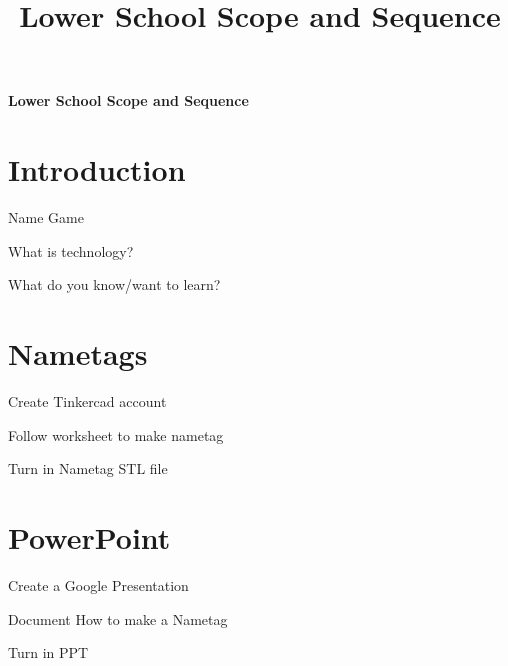 \documentclass{article}
\def\nametags{Nametags}
\def\ppt{PowerPoint}
\begin{document}
	\title{Lower School Scope and Sequence}
	\begin{titlepage}
		\begin{center}
			\Large\textbf{Lower School Scope and Sequence}\\
		\end{center}
	\end{titlepage}
	

	\vspace{1cm}
	\section{Introduction}
	\begin{todolist}
		\item Name Game
		\item What is technology?
		\item What do you know/want to learn?
	\end{todolist}
	\section{\nametags}
	\begin{todolist}
		\item Create Tinkercad account
		\item Follow worksheet to make nametag
		\item Turn in Nametag STL file
	\end{todolist}
	\section{\ppt}
	\begin{todolist}
		\item Create a Google Presentation
		\item Document How to make a Nametag
		\item Turn in PPT
	\end{todolist}
\newpage
\end{document}
